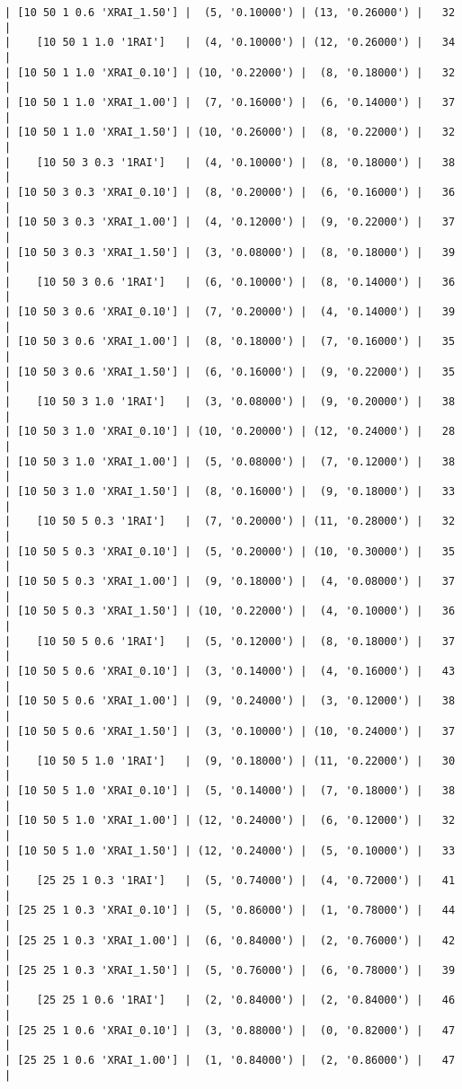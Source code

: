 \documentclass{article}
\begin{document}
\begin{verbatim}
| [10 50 1 0.6 'XRAI_1.50'] |  (5, '0.10000') | (13, '0.26000') |   32  |
|    [10 50 1 1.0 '1RAI']   |  (4, '0.10000') | (12, '0.26000') |   34  |
| [10 50 1 1.0 'XRAI_0.10'] | (10, '0.22000') |  (8, '0.18000') |   32  |
| [10 50 1 1.0 'XRAI_1.00'] |  (7, '0.16000') |  (6, '0.14000') |   37  |
| [10 50 1 1.0 'XRAI_1.50'] | (10, '0.26000') |  (8, '0.22000') |   32  |
|    [10 50 3 0.3 '1RAI']   |  (4, '0.10000') |  (8, '0.18000') |   38  |
| [10 50 3 0.3 'XRAI_0.10'] |  (8, '0.20000') |  (6, '0.16000') |   36  |
| [10 50 3 0.3 'XRAI_1.00'] |  (4, '0.12000') |  (9, '0.22000') |   37  |
| [10 50 3 0.3 'XRAI_1.50'] |  (3, '0.08000') |  (8, '0.18000') |   39  |
|    [10 50 3 0.6 '1RAI']   |  (6, '0.10000') |  (8, '0.14000') |   36  |
| [10 50 3 0.6 'XRAI_0.10'] |  (7, '0.20000') |  (4, '0.14000') |   39  |
| [10 50 3 0.6 'XRAI_1.00'] |  (8, '0.18000') |  (7, '0.16000') |   35  |
| [10 50 3 0.6 'XRAI_1.50'] |  (6, '0.16000') |  (9, '0.22000') |   35  |
|    [10 50 3 1.0 '1RAI']   |  (3, '0.08000') |  (9, '0.20000') |   38  |
| [10 50 3 1.0 'XRAI_0.10'] | (10, '0.20000') | (12, '0.24000') |   28  |
| [10 50 3 1.0 'XRAI_1.00'] |  (5, '0.08000') |  (7, '0.12000') |   38  |
| [10 50 3 1.0 'XRAI_1.50'] |  (8, '0.16000') |  (9, '0.18000') |   33  |
|    [10 50 5 0.3 '1RAI']   |  (7, '0.20000') | (11, '0.28000') |   32  |
| [10 50 5 0.3 'XRAI_0.10'] |  (5, '0.20000') | (10, '0.30000') |   35  |
| [10 50 5 0.3 'XRAI_1.00'] |  (9, '0.18000') |  (4, '0.08000') |   37  |
| [10 50 5 0.3 'XRAI_1.50'] | (10, '0.22000') |  (4, '0.10000') |   36  |
|    [10 50 5 0.6 '1RAI']   |  (5, '0.12000') |  (8, '0.18000') |   37  |
| [10 50 5 0.6 'XRAI_0.10'] |  (3, '0.14000') |  (4, '0.16000') |   43  |
| [10 50 5 0.6 'XRAI_1.00'] |  (9, '0.24000') |  (3, '0.12000') |   38  |
| [10 50 5 0.6 'XRAI_1.50'] |  (3, '0.10000') | (10, '0.24000') |   37  |
|    [10 50 5 1.0 '1RAI']   |  (9, '0.18000') | (11, '0.22000') |   30  |
| [10 50 5 1.0 'XRAI_0.10'] |  (5, '0.14000') |  (7, '0.18000') |   38  |
| [10 50 5 1.0 'XRAI_1.00'] | (12, '0.24000') |  (6, '0.12000') |   32  |
| [10 50 5 1.0 'XRAI_1.50'] | (12, '0.24000') |  (5, '0.10000') |   33  |
|    [25 25 1 0.3 '1RAI']   |  (5, '0.74000') |  (4, '0.72000') |   41  |
| [25 25 1 0.3 'XRAI_0.10'] |  (5, '0.86000') |  (1, '0.78000') |   44  |
| [25 25 1 0.3 'XRAI_1.00'] |  (6, '0.84000') |  (2, '0.76000') |   42  |
| [25 25 1 0.3 'XRAI_1.50'] |  (5, '0.76000') |  (6, '0.78000') |   39  |
|    [25 25 1 0.6 '1RAI']   |  (2, '0.84000') |  (2, '0.84000') |   46  |
| [25 25 1 0.6 'XRAI_0.10'] |  (3, '0.88000') |  (0, '0.82000') |   47  |
| [25 25 1 0.6 'XRAI_1.00'] |  (1, '0.84000') |  (2, '0.86000') |   47  |

\end{verbatim}
\end{document}
